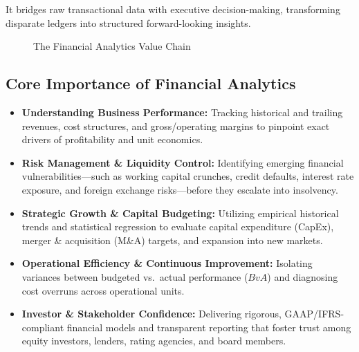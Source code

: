 \documentclass[11pt,a4paper]{article}
\begin{document}
It bridges raw transactional data with executive decision-making, transforming disparate ledgers into structured forward-looking insights.

\begin{figure}[htbp]
\centering
{}
\caption{The Financial Analytics Value Chain}
\label{fig:value-chain}
\end{figure}

\subsection{Core Importance of Financial Analytics}

\begin{itemize}
  \item \textbf{Understanding Business Performance:} Tracking historical and trailing revenues, cost structures, and gross/operating margins to pinpoint exact drivers of profitability and unit economics.
  \item \textbf{Risk Management \& Liquidity Control:} Identifying emerging financial vulnerabilities---such as working capital crunches, credit defaults, interest rate exposure, and foreign exchange risks---before they escalate into insolvency.
  \item \textbf{Strategic Growth \& Capital Budgeting:} Utilizing empirical historical trends and statistical regression to evaluate capital expenditure (CapEx), merger \& acquisition (M\&A) targets, and expansion into new markets.
  \item \textbf{Operational Efficiency \& Continuous Improvement:} Isolating variances between budgeted vs.\ actual performance ($BvA$) and diagnosing cost overruns across operational units.
  \item \textbf{Investor \& Stakeholder Confidence:} Delivering rigorous, GAAP/IFRS-compliant financial models and transparent reporting that foster trust among equity investors, lenders, rating agencies, and board members.
\end{itemize}
\end{document}
